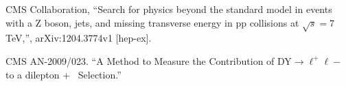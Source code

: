 \begin{thebibliography}{10}

 CMS Collaboration, ``Search for physics beyond the standard model in events with a Z boson, jets, and missing transverse energy in pp collisions at $\sqrt{s} = 7$ TeV,'', 	arXiv:1204.3774v1 [hep-ex].

 CMS AN-2009/023. ``A Method to Measure the Contribution of DY$\to\ell^+\ell−$ to a dilepton + \MET\ Selection.''

\end{thebibliography}
